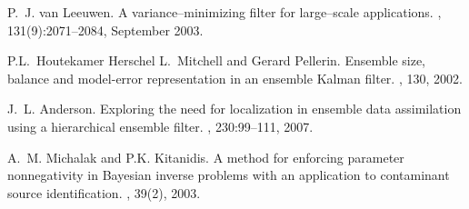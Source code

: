 \begin{thebibliography}{10}
P.~J. van Leeuwen.
\newblock A variance--minimizing filter for large--scale applications.
, 131(9):2071--2084, September 2003.

P.L.~Houtekamer Herschel L.~Mitchell and Gerard Pellerin.
\newblock Ensemble size, balance and model-error representation in an ensemble
  {K}alman filter.
, 130,
  2002.

J.~L. Anderson.
\newblock Exploring the need for localization in ensemble data assimilation
  using a hierarchical ensemble filter.
, 230:99--111, 2007.

A.~M. Michalak and P.K. Kitanidis.
\newblock A method for enforcing parameter nonnegativity in {B}ayesian inverse
  problems with an application to contaminant source identification.
, 39(2), 2003.


\end{thebibliography}
